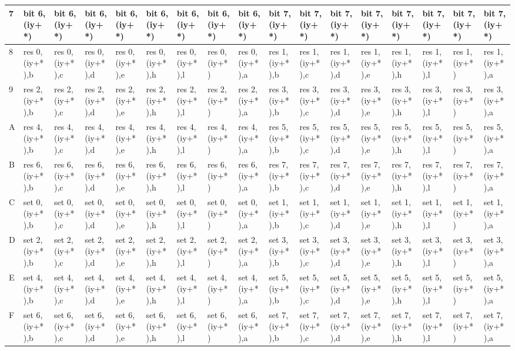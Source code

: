 \begin{ttfamily}
\begin{tiny}
\begin{tabularx}{1\textwidth}{l|X|X|X|X|X|X|X|X|X|X|X|X|X|X|X|X}
7 & bit 6, (iy+*)   & bit 6, (iy+*)   & bit 6, (iy+*)   & bit 6, (iy+*)   & bit 6, (iy+*)   & bit 6, (iy+*)   & bit 6, (iy+*) & bit 6, (iy+*)   & bit 7, (iy+*)   & bit 7, (iy+*)   & bit 7, (iy+*)   & bit 7, (iy+*) & bit 7, (iy+*) & bit 7, (iy+*) & bit 7, (iy+*) & bit 7, (iy+*) \\ \hline
8 & res 0, (iy+*),b & res 0, (iy+*),c & res 0, (iy+*),d & res 0, (iy+*),e & res 0, (iy+*),h & res 0, (iy+*),l & res 0, (iy+*) & res 0, (iy+*),a & res 1, (iy+*),b & res 1, (iy+*),c & res 1, (iy+*),d & res 1, (iy+*),e & res 1, (iy+*),h & res 1, (iy+*),l & res 1, (iy+*) & res 1, (iy+*),a \\ \hline
9 & res 2, (iy+*),b & res 2, (iy+*),c & res 2, (iy+*),d & res 2, (iy+*),e & res 2, (iy+*),h & res 2, (iy+*),l & res 2, (iy+*) & res 2, (iy+*),a & res 3, (iy+*),b & res 3, (iy+*),c & res 3, (iy+*),d & res 3, (iy+*),e & res 3, (iy+*),h & res 3, (iy+*),l & res 3, (iy+*) & res 3, (iy+*),a \\ \hline
A & res 4, (iy+*),b & res 4, (iy+*),c & res 4, (iy+*),d & res 4, (iy+*),e & res 4, (iy+*),h & res 4, (iy+*),l & res 4, (iy+*) & res 4, (iy+*),a & res 5, (iy+*),b & res 5, (iy+*),c & res 5, (iy+*),d & res 5, (iy+*),e & res 5, (iy+*),h & res 5, (iy+*),l & res 5, (iy+*) & res 5, (iy+*),a \\ \hline
B & res 6, (iy+*),b & res 6, (iy+*),c & res 6, (iy+*),d & res 6, (iy+*),e & res 6, (iy+*),h & res 6, (iy+*),l & res 6, (iy+*) & res 6, (iy+*),a & res 7, (iy+*),b & res 7, (iy+*),c & res 7, (iy+*),d & res 7, (iy+*),e & res 7, (iy+*),h & res 7, (iy+*),l & res 7, (iy+*) & res 7, (iy+*),a \\ \hline
C & set 0, (iy+*),b & set 0, (iy+*),c & set 0, (iy+*),d & set 0, (iy+*),e & set 0, (iy+*),h & set 0, (iy+*),l & set 0, (iy+*) & set 0, (iy+*),a & set 1, (iy+*),b & set 1, (iy+*),c & set 1, (iy+*),d & set 1, (iy+*),e & set 1, (iy+*),h & set 1, (iy+*),l & set 1, (iy+*) & set 1, (iy+*),a \\ \hline
D & set 2, (iy+*),b & set 2, (iy+*),c & set 2, (iy+*),d & set 2, (iy+*),e & set 2, (iy+*),h & set 2, (iy+*),l & set 2, (iy+*) & set 2, (iy+*),a & set 3, (iy+*),b & set 3, (iy+*),c & set 3, (iy+*),d & set 3, (iy+*),e & set 3, (iy+*),h & set 3, (iy+*),l & set 3, (iy+*) & set 3, (iy+*),a \\ \hline
E & set 4, (iy+*),b & set 4, (iy+*),c & set 4, (iy+*),d & set 4, (iy+*),e & set 4, (iy+*),h & set 4, (iy+*),l & set 4, (iy+*) & set 4, (iy+*),a & set 5, (iy+*),b & set 5, (iy+*),c & set 5, (iy+*),d & set 5, (iy+*),e & set 5, (iy+*),h & set 5, (iy+*),l & set 5, (iy+*) & set 5, (iy+*),a \\ \hline
F & set 6, (iy+*),b & set 6, (iy+*),c & set 6, (iy+*),d & set 6, (iy+*),e & set 6, (iy+*),h & set 6, (iy+*),l & set 6, (iy+*) & set 6, (iy+*),a & set 7, (iy+*),b & set 7, (iy+*),c & set 7, (iy+*),d & set 7, (iy+*),e & set 7, (iy+*),h & set 7, (iy+*),l & set 7, (iy+*) & set 7, (iy+*),a \\ \hline

\end{tabularx}
\end{tiny}
\end{ttfamily}
\begin{xen}
\end{xen}
